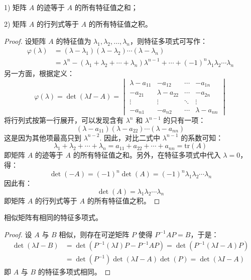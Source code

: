 \begin{theorem}
\ 

1) 矩阵 $A$ 的迹等于 $A$ 的所有特征值之和；

2) 矩阵 $A$ 的行列式等于 $A$ 的所有特征值之积。
\end{theorem}
\begin{proof}
设矩阵 $A$ 的特征值为 $\lambda_1,\lambda_2,\ldots,\lambda_n$，则特征多项式可写作：
\begin{align*}
    \varphi(\lambda)&=(\lambda-\lambda_1)(\lambda-\lambda_2)\cdots(\lambda-\lambda_n)\\
    &=\lambda^n-(\lambda_1+\lambda_2+\cdots+\lambda_n)\lambda^{n-1}+\cdots+(-1)^n\lambda_1\lambda_2\cdots\lambda_n
\end{align*}
另一方面，根据定义：
\[
    \varphi(\lambda)=\det(\lambda I-A)=
    \begin{vmatrix}
    \lambda-a_{11}&-a_{12}&\cdots&-a_{1n}\\
    -a_{21}&\lambda-a_{22}&\cdots&-a_{2n}\\
    \vdots&\vdots&\ddots&\vdots\\
    -a_{n1}&-a_{n2}&\cdots&\lambda-a_{nn}
    \end{vmatrix}
\]
将行列式按第一行展开，可以发现含有 $\lambda^n$ 和 $\lambda^{n-1}$ 的只有一项：
\[
    (\lambda-a_{11})(\lambda-a_{22})\cdots(\lambda-a_{nn})
\]
这是因为其他项最高只到 $\lambda^{n-2}$. 因此，对比二式中 $\lambda^{n-1}$ 的系数可知：
\[
    \lambda_1+\lambda_2+\cdots+\lambda_n=a_{11}+a_{22}+\cdots+a_{nn}=\text{tr}(A)
\]
即矩阵 $A$ 的迹等于 $A$ 的所有特征值之和。另外，在特征多项式中代入 $\lambda=0$，得：
\[
    \det(-A)=(-1)^n\det(A)=(-1)^n\lambda_1\lambda_2\cdots\lambda_n
\]
因此有：
\[
    \det(A)=\lambda_1\lambda_2\cdots\lambda_n
\]
即矩阵 $A$ 的行列式等于 $A$ 的所有特征值之积。
\end{proof}

\begin{theorem}
\label{thm:sim-eigen}
相似矩阵有相同的特征多项式。
\end{theorem}
\begin{proof}
设 $A$ 与 $B$ 相似，则存在可逆矩阵 $P$ 使得 $P^{-1}AP=B$，于是：
\begin{align*}
    \det(\lambda I-B)&=\det(P^{-1}(\lambda I)P-P^{-1}AP)=\det(P^{-1}(\lambda I-A)P)\\
    &=\det(P^{-1})\det(\lambda I-A)\det(P)=\det(\lambda I-A)
\end{align*}
即 $A$ 与 $B$ 的特征多项式相同。
\end{proof}

